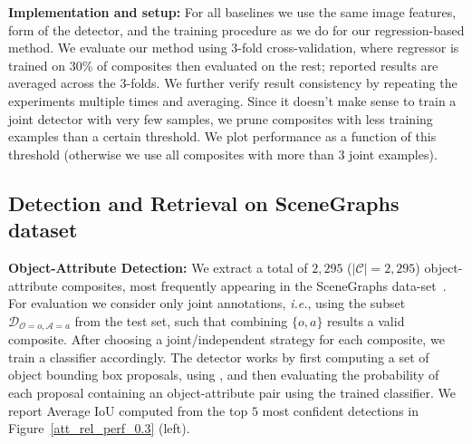 \documentclass[runningheads]{llncs}
\makeatletter
\newcommand{\RevComment} [1]{{\color{Red}{#1}}}
\newcommand*{\ie}{{\em i.e.}\@\xspace}
\makeatother
\begin{document}
\vspace{0.1in}
\noindent
{\bf Implementation and setup:} 
For all baselines we use the same image features, form of the detector, and the training procedure as we do for our regression-based method. We evaluate our method using 3-fold cross-validation, where regressor is trained on 30\% of composites then evaluated on the rest; reported results are averaged across the 3-folds.
We further verify result consistency by repeating the experiments multiple times and averaging. Since it doesn't make sense to train a joint detector with very few samples, we prune composites with less training examples than a certain threshold. We plot performance as a function of this threshold (otherwise we use all composites with more than 3 joint examples). 

\vspace{-0.05in}
\subsection{Detection and Retrieval on SceneGraphs dataset}
%
%
\noindent
{\bf Object-Attribute Detection:}
We extract a total of $2,295$ ($|\mathcal{C}| = 2,295$) object-attribute composites, most frequently appearing in the SceneGraphs data-set~\cite{Johnson2015}. For evaluation we consider only joint annotations, \ie, using the subset $\mathcal{D}_{\mathcal{O} = o, \mathcal{A}= a}$ from the test set, such that combining $\{o,a\}$ results a valid composite.
After choosing a joint/independent strategy for each composite, we train a classifier accordingly. 
The detector works by first computing a set of object bounding box proposals, using \cite{Uijlings2013}, and then evaluating the probability of each proposal containing an object-attribute pair using the trained classifier. 
We report Average IoU computed from the top $5$ most confident detections in Figure~\ref{att_rel_perf_0.3} (left).
\end{document}
